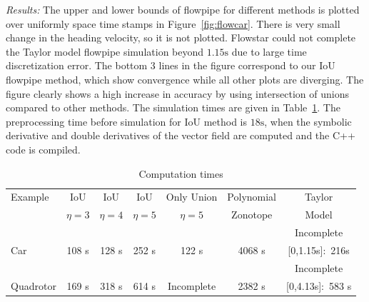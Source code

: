 
\emph{Results:}  The upper and lower bounds of flowpipe for different
  methods is plotted over uniformly space time stamps in
  Figure~\ref{fig:flowcar}.  There is very small change in the heading
  velocity, so it is not plotted.  Flowstar could not complete the
  Taylor model flowpipe simulation beyond $1.15\si{\second}$ due to
  large time discretization error.  The bottom 3 lines in the figure
  correspond to our IoU flowpipe method, which show convergence while
  all other plots are diverging.  The figure clearly shows a high
  increase in accuracy by using intersection of unions compared to
  other methods.  The simulation times are given in
  Table~\ref{tab:comptimes}.  The preprocessing time before simulation
  for IoU method is $18\si{\second}$, when the symbolic
  derivative and double derivatives of the vector field are computed and the C++ code is
  compiled.
\begin{table}
\begin{center}
\caption{Computation times}\label{tab:comptimes}
\begin{tabular}{|l|c|c|c|c|c|c|}
\hline
Example & IoU  & IoU  & IoU  & Only Union &
Polynomial & Taylor\\
& $\eta = 3$ & $\eta = 4$ & $\eta = 5$ & $\eta = 5$ & Zonotope & Model \\
\hline
& & & & & & {\color{red}Incomplete}\\
Car & 108 s & 128 s & 252 s & 122 s & 4068 s & {\color{red}[0,1.15s]:~216s}\\
\hline
& & & & & & {\color{red}Incomplete}\\
Quadrotor & 169 s & 318 s & 614 s & {\color{red}
Incomplete} & 2382 s & {\color{red}[0,4.13s]:~583 s} \\
\hline
\end{tabular}
\end{center}
\end{table}
